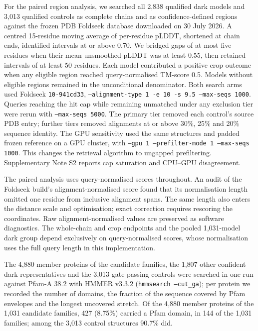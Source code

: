 For the paired region analysis, we searched all 2{,}838 qualified dark models and 3{,}013
qualified controls as complete chains and as confidence-defined regions against the frozen
PDB Foldseek database downloaded on 30 July 2026. A centred 15-residue moving average of
per-residue pLDDT, shortened at chain ends, identified intervals at or above 0.70.
We bridged gaps of at most five residues when their mean unsmoothed pLDDT was at least 0.55,
then retained intervals of at least 50 residues. Each model contributed a positive crop outcome
when any eligible region reached query-normalised TM-score 0.5. Models without eligible
regions remained in the unconditional denominator. Both search arms used Foldseek
\texttt{10-941cd33}, \texttt{--alignment-type 1 -e 10 -s 9.5 --max-seqs 1000}.
Queries reaching the hit cap while remaining unmatched under any exclusion tier were rerun
with \texttt{--max-seqs 5000}. The primary tier removed each control's source PDB entry;
further tiers removed alignments at or above 30\%, 25\% and 20\% sequence identity.
The GPU sensitivity used the same structures and padded frozen reference on a GPU cluster, with
\texttt{--gpu 1 --prefilter-mode 1 --max-seqs 1000}. This changes the retrieval algorithm to
ungapped prefiltering. Supplementary Note S2 reports cap saturation and CPU--GPU disagreement.

The paired analysis uses query-normalised scores throughout. An audit of the Foldseek build's
alignment-normalised score found that its normalisation length omitted one residue from
inclusive alignment spans. The same length also enters the distance scale and optimisation;
exact correction requires rescoring the coordinates. Raw alignment-normalised values are
preserved as software diagnostics. The whole-chain and crop endpoints and the pooled
1{,}031-model dark group depend exclusively on query-normalised scores, whose normalisation
uses the full query length in this implementation.


The 4{,}880 member proteins of
the candidate families, the 1{,}807 other confident dark representatives and the 3{,}013 gate-passing
controls were searched in one run against Pfam-A 38.2 with HMMER v3.3.2 (\texttt{hmmsearch --cut\_ga});
per protein we recorded the number of domains, the fraction of the sequence covered by Pfam
envelopes and the longest uncovered stretch. Of the 4{,}880 member proteins of the 1{,}031 candidate families, 427 (8.75\%) carried a Pfam domain, in 144 of the 1{,}031 families; among the 3{,}013 control structures 90.7\% did.

